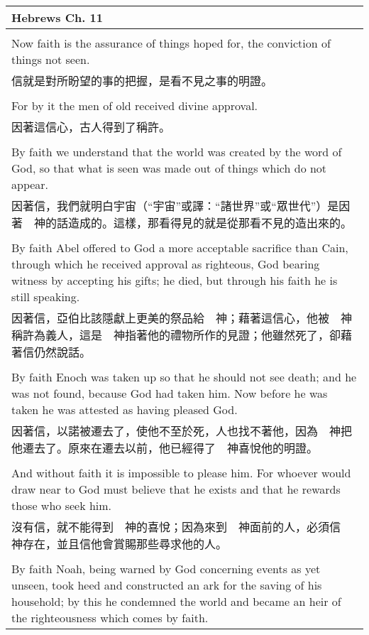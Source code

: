 \documentclass{book}
\begin{document}
\begin{tabularx}{\textwidth}{p{}}
\hline
Hebrews Ch. 11 \\
\hline \\
Now faith is the assurance of things hoped for, the conviction of things not seen. \\
信就是對所盼望的事的把握，是看不見之事的明證。 \\ \\
For by it the men of old received divine approval. \\
因著這信心，古人得到了稱許。 \\ \\
By faith we understand that the world was created by the word of God, so that what is seen was made out of things which do not appear. \\
因著信，我們就明白宇宙（“宇宙”或譯：“諸世界”或“眾世代”）是因著　神的話造成的。這樣，那看得見的就是從那看不見的造出來的。 \\ \\
By faith Abel offered to God a more acceptable sacrifice than Cain, through which he received approval as righteous, God bearing witness by accepting his gifts; he died, but through his faith he is still speaking. \\
因著信，亞伯比該隱獻上更美的祭品給　神；藉著這信心，他被　神稱許為義人，這是　神指著他的禮物所作的見證；他雖然死了，卻藉著信仍然說話。 \\ \\
By faith Enoch was taken up so that he should not see death; and he was not found, because God had taken him. Now before he was taken he was attested as having pleased God. \\
因著信，以諾被遷去了，使他不至於死，人也找不著他，因為　神把他遷去了。原來在遷去以前，他已經得了　神喜悅他的明證。 \\ \\
And without faith it is impossible to please him. For whoever would draw near to God must believe that he exists and that he rewards those who seek him. \\
沒有信，就不能得到　神的喜悅；因為來到　神面前的人，必須信　神存在，並且信他會賞賜那些尋求他的人。 \\ \\
By faith Noah, being warned by God concerning events as yet unseen, took heed and constructed an ark for the saving of his household; by this he condemned the world and became an heir of the righteousness which comes by faith. \\

\end{tabularx}
\end{document}
